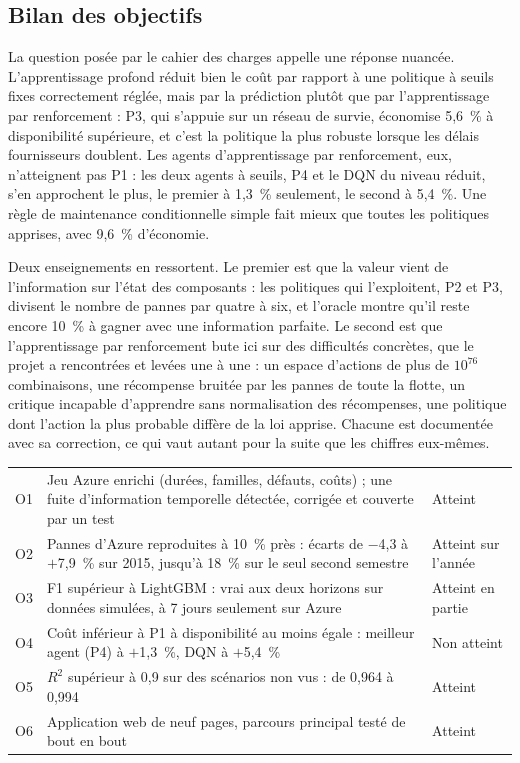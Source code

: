 \subsection{Bilan des objectifs}\label{sec:conclusion}

La question posée par le cahier des charges appelle une réponse nuancée. L'apprentissage profond réduit bien le coût par rapport à une politique à seuils fixes correctement réglée, mais par la prédiction plutôt que par l'apprentissage par renforcement : P3, qui s'appuie sur un réseau de survie, économise 5,6~\% à disponibilité supérieure, et c'est la politique la plus robuste lorsque les délais fournisseurs doublent. Les agents d'apprentissage par renforcement, eux, n'atteignent pas P1 : les deux agents à seuils, P4 et le DQN du niveau réduit, s'en approchent le plus, le premier à 1,3~\% seulement, le second à 5,4~\%. Une règle de maintenance conditionnelle simple fait mieux que toutes les politiques apprises, avec 9,6~\% d'économie.

Deux enseignements en ressortent. Le premier est que la valeur vient de l'information sur l'état des composants : les politiques qui l'exploitent, P2 et P3, divisent le nombre de pannes par quatre à six, et l'oracle montre qu'il reste encore 10~\% à gagner avec une information parfaite. Le second est que l'apprentissage par renforcement bute ici sur des difficultés concrètes, que le projet a rencontrées et levées une à une : un espace d'actions de plus de $10^{76}$ combinaisons, une récompense bruitée par les pannes de toute la flotte, un critique incapable d'apprendre sans normalisation des récompenses, une politique dont l'action la plus probable diffère de la loi apprise. Chacune est documentée avec sa correction, ce qui vaut autant pour la suite que les chiffres eux-mêmes.

\begin{tabularx}{\linewidth}{@{}l L P{3.2cm}@{}}
\caption{Atteinte des objectifs du cahier des charges}\label{tab:objectifs}\\
\toprule
{} &  &  \\
\midrule
O1 & Jeu Azure enrichi (durées, familles, défauts, coûts) ; une fuite d'information temporelle détectée, corrigée et couverte par un test & Atteint \\
O2 & Pannes d'Azure reproduites à 10~\% près : écarts de $-$4,3 à $+$7,9~\% sur 2015, jusqu'à 18~\% sur le seul second semestre & Atteint sur l'année \\
O3 & F1 supérieur à LightGBM : vrai aux deux horizons sur données simulées, à 7 jours seulement sur Azure & Atteint en partie \\
O4 & Coût inférieur à P1 à disponibilité au moins égale : meilleur agent (P4) à $+$1,3~\%, DQN à $+$5,4~\% & Non atteint \\
O5 & $R^2$ supérieur à 0,9 sur des scénarios non vus : de 0,964 à 0,994 & Atteint \\
O6 & Application web de neuf pages, parcours principal testé de bout en bout & Atteint \\
\bottomrule
\end{tabularx}

